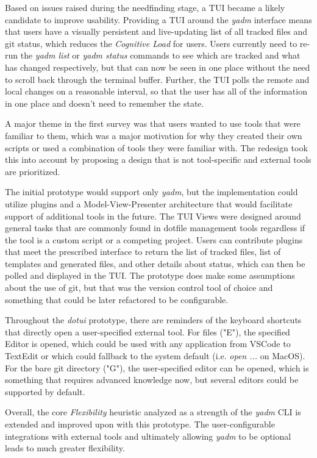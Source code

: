 \documentclass[letterpaper]{jdf}
\begin{document}
 Based on issues raised during the needfinding stage, a TUI became a likely candidate to improve usability. Providing a TUI around the \emph{yadm} interface means that users have a visually persistent and live-updating list of all tracked files and git status, which reduces the \emph{Cognitive Load} for users. Users currently need to re-run the \emph{yadm list} or \emph{yadm status} commands to see which are tracked and what has changed respectively, but that can now be seen in one place without the need to scroll back through the terminal buffer. Further, the TUI polls the remote and local changes on a reasonable interval, so that the user has all of the information in one place and doesn't need to remember the state.

 A major theme in the first survey was that users wanted to use tools that were familiar to them, which was a major motivation for why they created their own scripts or used a combination of tools they were familiar with. The redesign took this into account by proposing a design that is not tool-specific and external tools are prioritized.

The initial prototype would support only \emph{yadm}, but the implementation could utilize plugins and a Model-View-Presenter architecture that would facilitate support of additional tools in the future. The TUI Views were designed around general tasks that are commonly found in dotfile management tools regardless if the tool is a custom script or a competing project. Users can contribute plugins that meet the prescribed interface to return the list of tracked files, list of templates and generated files, and other details about status, which can then be polled and displayed in the TUI. The prototype does make some assumptions about the use of git, but that was the version control tool of choice and something that could be later refactored to be configurable.

Throughout the \emph{dotui} prototype, there are reminders of the keyboard shortcuts that directly open a user-specified external tool. For files ("E"), the specified Editor is opened, which could be used with any application from VSCode to TextEdit or which could fallback to the system default (i.e. \emph{open ...} on MacOS). For the bare git directory ("G"), the user-specified editor can be opened, which is something that requires advanced knowledge now, but several editors could be supported by default.

Overall, the core \emph{Flexibility} heuristic analyzed as a strength of the \emph{yadm} CLI is extended and improved upon with this prototype. The user-configurable integrations with external tools and ultimately allowing \emph{yadm} to be optional leads to much greater flexibility.
\end{document}
